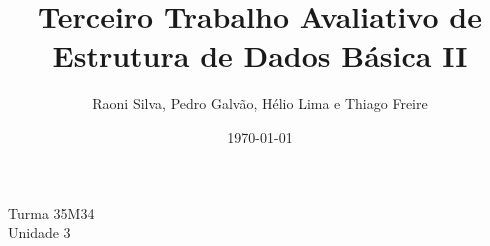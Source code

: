 \documentclass[a4paper,12pt]{article}
\title{Terceiro Trabalho Avaliativo de Estrutura de Dados Básica II}
\author{Raoni Silva, Pedro Galvão, Hélio Lima e Thiago Freire}
\date{\today}
\begin{document}
\maketitle

\noindent Turma 35M34 \\ Unidade 3

\newpage

\tableofcontents






\end{document}
